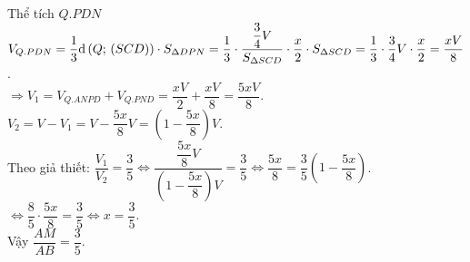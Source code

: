 \begin{ex}
{
		Thể tích $ Q.PDN$\\
		$V_{Q.PDN}=\dfrac{1}{3}{\rm{d}}\left(Q;\,\left(SCD\right)\right)\cdot S_{\Delta DPN}=\dfrac{1}{3}\cdot \dfrac{\dfrac{3}{4}V}{S_{\Delta SCD}}\cdot \dfrac{x}{2}\cdot S_{\Delta SCD}=\dfrac{1}{3}\cdot \dfrac{3}{4}V\cdot \dfrac{x}{2}=\dfrac{xV}{8}$.\\
		$\Rightarrow{V_1}=V_{Q.ANPD}+V_{Q.PND}=\dfrac{xV}{2}+\dfrac{xV}{8}=\dfrac{5xV}{8}$.\\
		$V_2=V-V_1=V-\dfrac{5x}{8}V=\left(1-\dfrac{5x}{8}\right)V$.\\
		Theo giả thiết: $\dfrac{V_1}{V_2}=\dfrac{3}{5}\Leftrightarrow\dfrac{\dfrac{5x}{8}V}{\left(1-\dfrac{5x}{8}\right)V}=\dfrac{3}{5}\Leftrightarrow\dfrac{5x}{8}=\dfrac{3}{5}\left(1-\dfrac{5x}{8}\right)$.\\
		$\Leftrightarrow\dfrac{8}{5}\cdot \dfrac{5x}{8}=\dfrac{3}{5}\Leftrightarrow x=\dfrac{3}{5}$.\\
		Vậy $\dfrac{AM}{AB}=\dfrac{3}{5}$.}
\end{ex}
